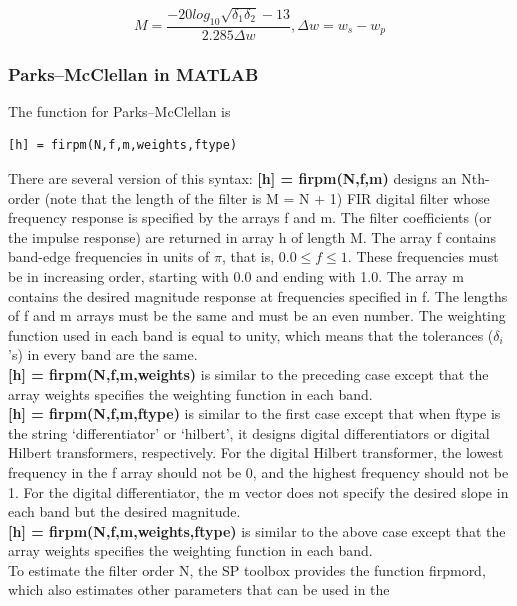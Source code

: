 \documentclass{article}
\begin{document}
\begin{equation}
M = \frac{-20log_{10}\sqrt{\delta_1\delta_2}-13}{2.285\Delta w},\Delta w=w_s-w_p
\end{equation}
\subsubsection{Parks–McClellan in MATLAB}
The function for Parks–McClellan is 
\begin{lstlisting}
[h] = firpm(N,f,m,weights,ftype)  
\end{lstlisting}
There are several version of this syntax:
\textbf{[h] = firpm(N,f,m)} designs an Nth-order (note that the length of the
filter is M = N + 1) FIR digital filter whose frequency response is
specified by the arrays f and m. The filter coefficients (or the impulse
response) are returned in array h of length M. The array f contains
band-edge frequencies in units of $\pi$, that is, 0.$0 \leq f \leq 1$. These frequencies must be in increasing order, starting with 0.0 and ending with
1.0. The array m contains the desired magnitude response at frequencies specified in f. The lengths of f and m arrays must be the same and
must be an even number. The weighting function used in each band is equal to unity, which means that the tolerances ($\delta_i$'s) in every band
are the same. \\
\vspace{1em}
\textbf{[h] = firpm(N,f,m,weights)} is similar to the preceding case except
that the array weights specifies the weighting function in each band.\\
\vspace{1em}
\textbf{[h] = firpm(N,f,m,ftype)} is similar to the first case except that
when ftype is the string ‘differentiator' or ‘hilbert', it designs
digital differentiators or digital Hilbert transformers, respectively. For
the digital Hilbert transformer, the lowest frequency in the f array
should not be 0, and the highest frequency should not be 1. For the
digital differentiator, the m vector does not specify the desired slope in
each band but the desired magnitude. \\
\vspace{1em}
\textbf{[h] = firpm(N,f,m,weights,ftype)} is similar to the above case except that the array weights specifies the weighting function in each
band. \\
\vspace{1em}
To estimate the filter order N, the SP toolbox provides the function
firpmord, which also estimates other parameters that can be used in the
\end{document}
